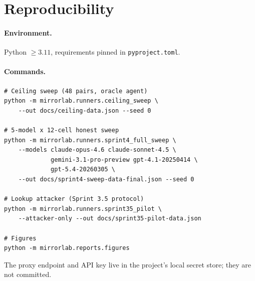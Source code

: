 \section{Reproducibility}
\label{app:repro}

\paragraph{Environment.} Python $\geq 3.11$, requirements pinned in
\texttt{pyproject.toml}.

\paragraph{Commands.}
\begin{verbatim}
# Ceiling sweep (48 pairs, oracle agent)
python -m mirrorlab.runners.ceiling_sweep \
    --out docs/ceiling-data.json --seed 0

# 5-model x 12-cell honest sweep
python -m mirrorlab.runners.sprint4_full_sweep \
    --models claude-opus-4.6 claude-sonnet-4.5 \
             gemini-3.1-pro-preview gpt-4.1-20250414 \
             gpt-5.4-20260305 \
    --out docs/sprint4-sweep-data-final.json --seed 0

# Lookup attacker (Sprint 3.5 protocol)
python -m mirrorlab.runners.sprint35_pilot \
    --attacker-only --out docs/sprint35-pilot-data.json

# Figures
python -m mirrorlab.reports.figures
\end{verbatim}

The proxy endpoint and API key live in the project's local secret store;
they are not committed.
